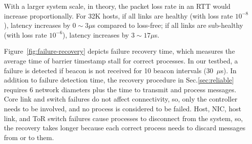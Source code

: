 With a larger system scale, in theory, the packet loss rate in an RTT would increase proportionally. For 32K hosts, if all links are healthy (with loss rate $10^{-8}$), latency increases by $0\sim 3\mu$s compared to loss-free; if all links are sub-healthy (with loss rate $10^{-6}$), latency increases by $3\sim 17\mu$s.





Figure~\ref{fig:failure-recovery} depicts failure recovery time, which measures the average time of barrier timestamp stall for correct processes.
In our testbed, a failure is detected if beacon is not received for 10 beacon intervals (30~$\mu$s).
In addition to failure detection time, the recovery procedure in Sec.\ref{sec:reliable} requires 6 network diameters plus the time to transmit and process messages.
Core link and switch failures do not affect connectivity, so, only the controller needs to be involved, and no process is considered to be failed.
Host, NIC, host link, and ToR switch failures cause processes to disconnect from the system, so, the recovery takes longer because each correct process needs to discard messages from or to them.




